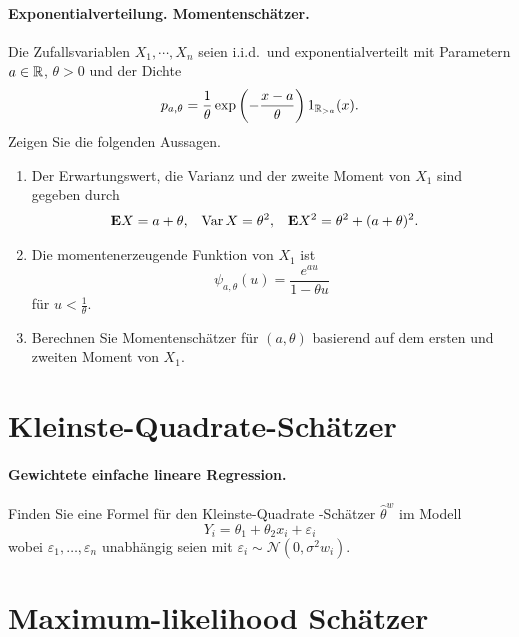 \paragraph{Exponentialverteilung. Momentenschätzer.} 
Die Zufallsvariablen $X_1, \cdots, X_n$ seien i.i.d.\ und exponentialverteilt mit 
Parametern $a\in \mathbb R$, $\theta>0$ und der Dichte
\begin{equation*}
    p_{a,\theta} =\frac{1}{\theta} \exp \left( - \frac{x-a}{\theta} \right) 1_{\mathbb R_{>a}}(x).
\end{equation*}
Zeigen Sie die folgenden Aussagen.
\begin{enumerate}
    \item Der Erwartungswert, die Varianz und der zweite Moment von $X_1$ sind gegeben durch
        \begin{align*}
            \mathbf{E} X &= a+\theta, & \operatorname{Var} X &= \theta^2, & \mathbf{E} X^2 &= \theta^2 + (a+\theta)^2. 
        \end{align*}
    \item Die momentenerzeugende Funktion von $X_1$ ist 
        \begin{equation*}
            \psi_{a,\theta}(u) = \frac{e^{au}}{1- \theta u}
        \end{equation*}
        für $u<\frac{1}{\theta}$.
    \item Berechnen Sie Momentenschätzer für $(a,\theta)$ basierend auf dem ersten und zweiten 
        Moment von $X_1$. 
\end{enumerate}



\section{Kleinste-Quadrate-Schätzer}

\paragraph{Gewichtete einfache lineare Regression. }
Finden Sie eine Formel für den Kleinste-Quadrate -Schätzer $\hat \theta^w$
im Modell
\begin{equation*}
	Y_i = \theta_1 + \theta_2 x_i + \varepsilon_i
\end{equation*}
wobei $\varepsilon_1,\ldots, \varepsilon_n$ unabhängig seien mit $\varepsilon_i \sim \mathcal N(0, \sigma^2w_i)$.



\section{Maximum-likelihood Schätzer}

